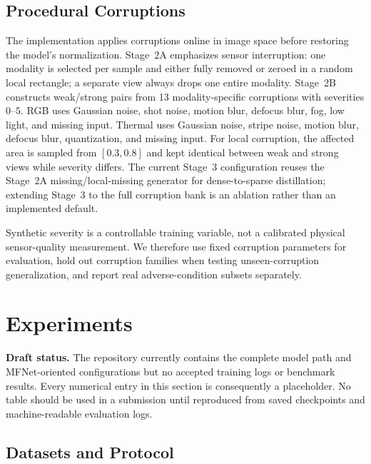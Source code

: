 \documentclass[10pt,twocolumn,letterpaper]{article}
\begin{document}
\subsection{Procedural Corruptions}
\label{sec:corruptions}

The implementation applies corruptions online in image space before restoring the model's normalization.
Stage~2A emphasizes sensor interruption: one modality is selected per sample and either fully removed or zeroed in a random local rectangle; a separate view always drops one entire modality.
Stage~2B constructs weak/strong pairs from 13 modality-specific corruptions with severities $0$--$5$.
RGB uses Gaussian noise, shot noise, motion blur, defocus blur, fog, low light, and missing input.
Thermal uses Gaussian noise, stripe noise, motion blur, defocus blur, quantization, and missing input.
For local corruption, the affected area is sampled from $[0.3,0.8]$ and kept identical between weak and strong views while severity differs.
The current Stage~3 configuration reuses the Stage~2A missing/local-missing generator for dense-to-sparse distillation; extending Stage~3 to the full corruption bank is an ablation rather than an implemented default.

Synthetic severity is a controllable training variable, not a calibrated physical sensor-quality measurement.
We therefore use fixed corruption parameters for evaluation, hold out corruption families when testing unseen-corruption generalization, and report real adverse-condition subsets separately.

\section{Experiments}
\label{sec:experiments}

\noindent\textbf{Draft status.}
The repository currently contains the complete model path and MFNet-oriented configurations but no accepted training logs or benchmark results.
Every numerical entry in this section is consequently a placeholder.
No table should be used in a submission until reproduced from saved checkpoints and machine-readable evaluation logs.

\subsection{Datasets and Protocol}
\end{document}
